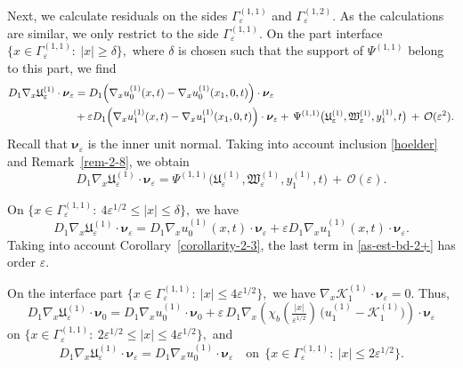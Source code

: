 \documentclass[reqno]{amsart}            %
\numberwithin{equation}{section}
\begin{document}
	Next, we calculate residuals on the sides $\Gamma_\varepsilon^{(1,1)}$ and $\Gamma_\varepsilon^{(1,2)}.$ As the calculations are similar, we only restrict to the side $\Gamma_\varepsilon^{(1,1)}.$	
	On the part interface $\{x\in \Gamma_\varepsilon^{(1,1)}\colon \ |x| \ge \delta\},$ where $\delta$ is chosen such that the support of $\Psi^{(1,1)}$ belong to this part, we find
	\begin{align}\label{as-est-bd-1}
		D_1\nabla_x \mathfrak{U}_\varepsilon^{(1)} \cdot\boldsymbol{\nu}_\varepsilon  & = D_1\Big( \nabla_x u_0^{(1)}(x,t) - \nabla_x u_0^{(1)}(x_1, 0,t) \Big)  \cdot\boldsymbol{\nu}_\varepsilon \notag 
		\\ &+ \varepsilon D_1 \Big( \nabla_x u_1^{(1)}(x,t) - \nabla_x u_1^{(1)}(x_1, 0,t) \Big)  \cdot\boldsymbol{\nu}_\varepsilon
		+ \, \Psi^{(1,1)}\big(\mathfrak{U}_\varepsilon^{(1)}, \mathfrak{W}^{(1)}_\varepsilon, y_1^{(1)},t\big)\,  + \, \mathcal{O}(\varepsilon^2).
	\end{align}
	Recall that $\boldsymbol{\nu}_\varepsilon$ is the inner unit normal. 	
	Taking into account inclusion \eqref{hoelder} and Remark~\ref{rem-2-8}, we obtain 
	\begin{equation}\label{as-est-bd-2}
		D_1\nabla_x \mathfrak{U}_\varepsilon^{(1)} \cdot\boldsymbol{\nu}_\varepsilon = \Psi^{(1,1)}\big(\mathfrak{U}_\varepsilon^{(1)}, \mathfrak{W}^{(1)}_\varepsilon, y_1^{(1)},t\big)\,  + \, \mathcal{O}(\varepsilon).
	\end{equation}
	
	On $\{x\in \Gamma_\varepsilon^{(1,1)}\colon \ 4 \varepsilon^{1/2} \le |x| \le \delta\},$ we 
	have 
	\begin{equation}\label{as-est-bd-2+}
		D_1\nabla_x \mathfrak{U}_\varepsilon^{(1)} \cdot\boldsymbol{\nu}_\varepsilon   = D_1\nabla_x u_0^{(1)}(x,t) \cdot\boldsymbol{\nu}_\varepsilon + \varepsilon D_1\nabla_x u_1^{(1)}(x,t) \cdot\boldsymbol{\nu}_\varepsilon.
	\end{equation}
	Taking into account  Corollary~\ref{corollarity-2-3}, the last  term in \eqref{as-est-bd-2+} has order $\varepsilon.$
	
	On the interface part $\{x\in \Gamma_\varepsilon^{(1,1)}\colon \ |x| \le 4 \varepsilon^{1/2}\},$ we have $\nabla_x \mathcal{K}^{(1)}_1 \cdot\boldsymbol{\nu}_\varepsilon =0.$ Thus, 
	\begin{equation}\label{as-est-bd-3}
		D_1 \nabla_x \mathfrak{U}_\varepsilon^{(1)} \cdot\boldsymbol{\nu}_0 = D_1\nabla_x u_0^{(1)}\cdot\boldsymbol{\nu}_0  + \varepsilon \, D_1 \nabla_x\left(\chi_b(\tfrac{|x|}{\varepsilon^{1/2}}) \, \big(u_1^{(1)} - \mathcal{K}_1^{(1)}\big)\right) \cdot\boldsymbol{\nu}_\varepsilon	
	\end{equation}
	on $\{x\in \Gamma_\varepsilon^{(1,1)}\colon \ 2 \varepsilon^{1/2} \le |x| \le 4 \varepsilon^{1/2}\},$ and 
	\begin{equation}\label{as-est-bd-4}
		D_1 \nabla_x \mathfrak{U}_\varepsilon^{(1)} \cdot\boldsymbol{\nu}_\varepsilon = D_1\nabla_x u_0^{(1)}\cdot\boldsymbol{\nu}_\varepsilon \quad \text{on} \ \
		\{x\in \Gamma_\varepsilon^{(1,1)}\colon \ |x| \le 2 \varepsilon^{1/2}\}.
	\end{equation}
	
\end{document}
